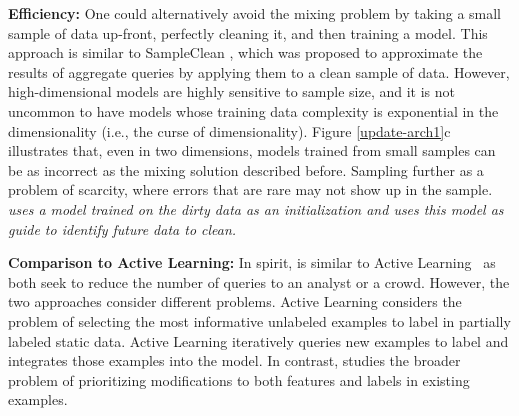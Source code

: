 \vspace{0.5em}
\noindent \textbf{Efficiency: } One could alternatively avoid the mixing problem by taking a small sample of data up-front, perfectly cleaning it, and then training a model.
This approach is similar to SampleClean \cite{wang1999sample}, which was proposed to approximate the results of aggregate queries by applying them to a clean sample of data.
However, high-dimensional models are highly sensitive to sample size, and it is not uncommon to have models whose training data complexity is exponential in the dimensionality (i.e., the curse of dimensionality).
Figure \ref{update-arch1}c illustrates that, even in two dimensions, models trained from small samples can be as incorrect as the mixing solution described before.
Sampling further as a problem of scarcity, where errors that are rare may not show up in the sample.
\emph{\sys uses a model trained on the dirty data as an initialization and uses this model as guide to identify future data to clean.}

\vspace{0.5em}
\noindent \textbf{Comparison to Active Learning: } In spirit, \sys is similar to Active Learning~\cite{DBLP:journals/pvldb/YakoutENOI11,gokhale2014corleone} as both seek to reduce the number of queries to an analyst or a crowd.
However, the two approaches consider different problems.
Active Learning considers the problem of selecting the most informative unlabeled examples to label in partially labeled static data.
Active Learning iteratively queries new examples to label and integrates those examples into the model.
In contrast, \sys studies the broader problem of prioritizing modifications to both features and labels in existing examples.





